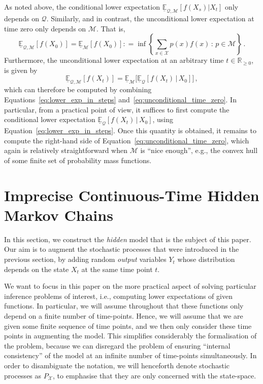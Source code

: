 \documentclass[3p]{elsarticle}
\newcommand{\reals}{\mathbb{R}}
\newcommand{\realsnonneg}{\reals_{\geq 0}}
\newcommand{\states}{\mathcal{X}}
\newcommand{\lexp}{\underline{\mathbb{E}}_{\rateset,\mathcal{M}}}
\newcommand{\rateset}{\mathcal{Q}}
\newcommand{\coloneqq}{:\!=}
\begin{document}
As noted above, the conditional lower expectation $\lexp[f(X_s)\vert X_t]$ only depends on $\rateset$. Similarly, and in contrast, the unconditional lower expectation at time zero only depends on $\mathcal{M}$. That is,
\begin{equation}\label{eq:unconditional_time_zero}
\lexp[f(X_0)] = \underline{\mathbb{E}}_{\mathcal{M}}[f(X_0)] \coloneqq \inf\left\{ \sum_{x\in\states}p(x)f(x)\,:\,p\in\mathcal{M} \right\}\,.
\end{equation}
Furthermore, the unconditional lower expectation at an arbitrary time $t\in\realsnonneg$, is given by
\begin{equation}\label{eq:unconditional_lower_exp}
\underline{\mathbb{E}}_{\rateset,\mathcal{M}}[f(X_t)] = \underline{\mathbb{E}}_{\mathcal{M}}\bigl[\underline{\mathbb{E}}_{\rateset}[f(X_t)\,\vert\,X_0]\bigr]\,,
\end{equation}
which can therefore be computed by combining Equations~\eqref{eq:lower_exp_in_steps} and~\eqref{eq:unconditional_time_zero}. In particular, from a practical point of view, it suffices to first compute the conditional lower expectation $\underline{\mathbb{E}}_{\rateset}[f(X_t)\,\vert\,X_0]$, using Equation~\eqref{eq:lower_exp_in_steps}. Once this quantity is obtained, it remains to compute the right-hand side of Equation~\eqref{eq:unconditional_time_zero}, which again is relatively straightforward when $\mathcal{M}$ is ``nice enough'', e.g., the convex hull of some finite set of probability mass functions.

\section{Imprecise Continuous-Time Hidden Markov Chains}\label{sec:icthmc}

In this section, we construct the \emph{hidden} model that is the subject of this paper. Our aim is to augment the stochastic processes that were introduced in the previous section, by adding random \emph{output} variables $Y_t$ whose distribution depends on the state $X_t$ at the same time point $t$.



We want to focus in this paper on the more practical aspect of solving particular inference problems of interest, i.e., computing lower expectations of given functions. In particular, we will assume throughout that these functions only depend on a finite number of time-points. 
Hence, we will assume that we are given some finite sequence of time points, and we then only consider these time points in augmenting the model. This simplifies considerably the formalisation of the problem, because we can disregard the problem of ensuring ``internal consistency'' of the model at an infinite number of time-points simultaneously. In order to disambiguate the notation, we will henceforth denote stochastic processes as $P_\states$, to emphasise that they are only concerned with the state-space.
\vspace{-4pt}
\end{document}

